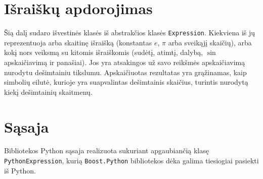 \section{Išraiškų apdorojimas}

Šią dalį sudaro išvestinės klasės iš abstrakčios klasės \verb|Expression|.
Kiekviena iš jų reprezentuoja arba skaitinę išraišką (konstantas $e$,
$\pi$ arba sveikąjį skaičių), arba kokį nors veiksmą su kitomis išraiškomis
(sudėtį, atimtį, dalybą, $\sin$ apskaičiavimą ir panašiai). Jos yra 
atsakingos už savo reikšmės apskaičiavimą nurodytu dešimtainiu tikslumu.
Apskaičiuotas rezultatas yra grąžinamas, kaip simbolių eilutė, kurioje yra
suapvalintas dešimtainis skaičius, turintis nurodytą kiekį dešimtainių
skaitmenų.

\section{Sąsaja}

Bibliotekos Python sąsaja realizuota sukuriant apgaubiančią klasę
\verb|PythonExpression|, kurią \verb|Boost.Python| bibliotekos dėka
galima tiesiogiai pasiekti iš Python.

